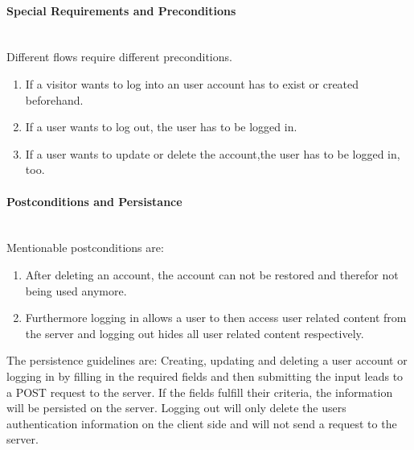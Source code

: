 \paragraph*{Special Requirements and Preconditions}\mbox{}\\
Different flows require different preconditions.
\begin{enumerate}
	\vspace{-3mm}
	\setlength\itemsep{-1em}
	\item If a visitor wants to log into an user account has to exist or created beforehand.
	\item If a user wants to log out, the user has to be logged in.
	\item If a user wants to update or delete the account,the user has to be logged in, too.
\end{enumerate}

\paragraph*{Postconditions and Persistance}\mbox{}\\
Mentionable postconditions are:
\begin{enumerate}
	\vspace{-3mm}
	\setlength\itemsep{-1em}
	\item After deleting an account, the account can not be restored and therefor not being used anymore.
	\item Furthermore logging in allows a user to then access user related content from the server and logging out hides all user related content respectively.
\end{enumerate}

\noindent
The persistence guidelines are: 
\newline
\noindent
Creating, updating and deleting a user account or logging in by filling in the required fields and then submitting the input leads to a POST request to the server. If the fields fulfill their criteria, the information will be persisted on the server. Logging out will only delete the users authentication information on the client side and will not send a request to the server.

